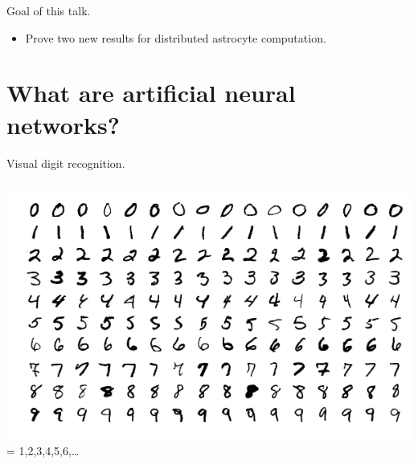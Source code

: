 \documentclass[10pt]{beamer}
\begin{document}
\begin{frame}[fragile]{Goal of this talk.}
\begin{itemize}
    \item Prove two new results for distributed astrocyte computation.
\end{itemize}
\end{frame}


\section[Artificial neural networks.]{What are artificial neural networks?}

\begin{frame}[fragile]{Visual digit recognition.}
\begin{columns}
\centering
\includegraphics[scale=0.25]{images/minst.png}
\centering
 = 1,2,3,4,5,6,\ldots
\end{columns}
\end{frame}
\end{document}
